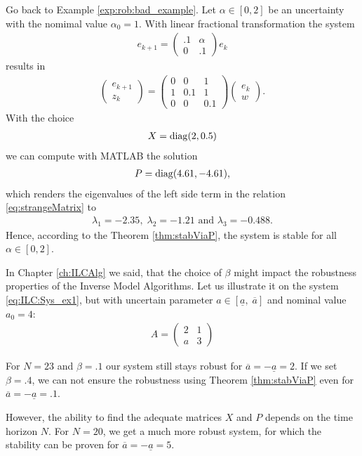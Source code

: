 Go back to Example \ref{exp:rob:bad_example}. 
Let $\alpha \in [0,2]$ be an uncertainty with the nomimal value $\alpha_0 = 1$.
With linear fractional transformation the system 
\begin{align}
e_{k+1} = \begin{pmatrix}
.1 & \alpha \\ 0 &.1
\end{pmatrix}e_k
\end{align}
results in 
\begin{align}
\begin{pmatrix}
e_{k+1} \\ z_k
\end{pmatrix} = 
\begin{pmatrix}
0 & 0 & 1 \\
1 & 0.1 & 1 \\
0 & 0 & 0.1
\end{pmatrix} \begin{pmatrix}
e_k \\ w
\end{pmatrix}. 
\end{align}
With the choice 
\begin{align}
X = \operatorname*{diag}(2, 0.5)
\end{align}
we can compute with MATLAB the solution 
\begin{align}
P = \operatorname*{diag}(4.61, -4.61), 
\end{align}
which renders the eigenvalues of the left side term in the relation \eqref{eq:strangeMatrix} to 
\begin{align}
\lambda_1 = -2.35, \; \lambda_2 = -1.21 \text{ and } \lambda_3 = -0.488.
\end{align}
Hence, according to the Theorem \ref{thm:stabViaP}, the system is stable for all $\alpha \in [0,2]$. 

\begin{exam}
	\label{ex:Rob:robvsN}
	In Chapter \ref{ch:ILCAlg} we said, that the choice of $\beta$ might impact the robustness properties of the Inverse Model Algorithms.
	Let us illustrate it on the system \eqref{eq:ILC:Sys_ex1}, but with uncertain parameter $a \in [\underline{a}, \; \overline{a}]$ and nominal value $a_0 = 4$: 
	\begin{align}
	A = \begin{pmatrix}
	2 & 1 \\  a & 3
	\end{pmatrix}
	\end{align}
			
	For $N = 23$ and $\beta = .1$ our system still stays robust for $\overline a = - \underline a = 2$. If we set $\beta = .4$, we can not ensure the robustness using Theorem \ref{thm:stabViaP} even for $\overline a = - \underline a = .1$. 
	
	However, the ability to find the adequate matrices $X$ and $P$ depends on the time horizon $N$. 
	For $N = 20$, we get a much more robust system, for which the stability can be proven for $\overline a = - \underline a = 5$. 
\end{exam}


